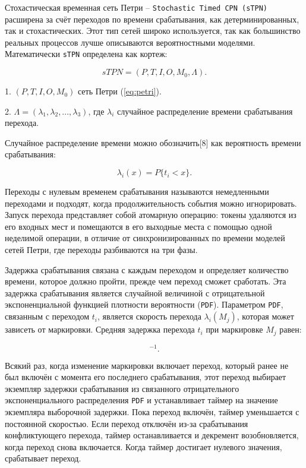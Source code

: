 Стохастическая временная сеть Петри -- \texttt{Stochastic Timed CPN (sTPN)} расширена за счёт переходов по времени срабатывания\cite{introspn}, как детерминированных, так и стохастических\cite{dadaya}. Этот тип сетей широко используется\cite{introspn2}, так как большинство реальных процессов лучше описываются вероятностными моделями. Математически \texttt{sTPN} определена как кортеж:

\begin{equation}
	sTPN = (P, T, I, O, M_0, \Lambda).
\end{equation}

1. $(P, T, I, O, M_0)$ сеть Петри (\ref{eq:petri}).

2. $\Lambda = (\lambda_1, \lambda_2, ..., \lambda_3)$, где $\lambda_i$ случайное распределение времени срабатывания перехода.

Случайное распределение времени можно обозначить[8] как вероятность времени срабатывания:

\begin{equation}
	\lambda_i(x) = P\{t_i < x\}.
\end{equation}

Переходы с нулевым временем срабатывания называются немедленными переходами и подходят, когда продолжительность события можно игнорировать. Запуск перехода представляет собой атомарную операцию: токены удаляются из его входных мест и помещаются в его выходные места с помощью одной неделимой операции, в отличие от синхронизированных по времени моделей сетей Петри, где переходы разбиваются на три фазы.  

Задержка срабатывания связана с каждым переходом и определяет количество времени, которое должно пройти, прежде чем переход сможет сработать. Эта задержка срабатывания является случайной величиной с отрицательной экспоненциальной функцией плотности вероятности (\texttt{PDF}). Параметром \texttt{PDF}, связанным с переходом $t_i$, является скорость перехода $\lambda_i (M_j)$, которая может зависеть от маркировки. Средняя задержка перехода $t_i$ при маркировке $M_j$ равен:  

\begin{equation}
	[\lambda_i(M_j)]^{-1}.
\end{equation}

Всякий раз, когда изменение маркировки включает переход, который ранее не был включён с момента его последнего срабатывания, этот переход выбирает экземпляр задержки срабатывания из связанного отрицательного экспоненциального распределения \texttt{PDF} и устанавливает таймер на значение экземпляра выборочной задержки. Пока переход включён, таймер уменьшается с постоянной скоростью. Если переход отключён из-за срабатывания конфликтующего перехода, таймер останавливается и декремент возобновляется, когда переход снова включается. Когда таймер достигает нулевого значения, срабатывает переход.

